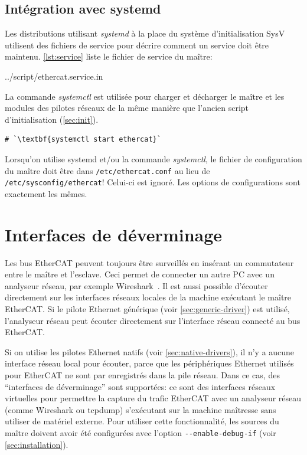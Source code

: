 \documentclass[a4paper,12pt,BCOR=6mm,bibtotoc,idxtotoc]{scrbook}
\begin{document}
\subsection{Int\'egration avec systemd}
\label{sec:systemd}

Les distributions utilisant \textit{systemd} \`a la place du syst\`eme
d'initialisation SysV utilisent des fichiers de service pour d\'ecrire
comment un service doit \^etre maintenu.  \autoref{lst:service} liste
le fichier de service du ma\^itre:


    {../script/ethercat.service.in}

La commande \textit{systemctl} est utilis\'ee pour charger et
d\'echarger le ma\^itre et les modules des pilotes r\'eseaux de la
m\^eme mani\`ere que l'ancien script d'initialisation
(\autoref{sec:init}).

\begin{lstlisting}[gobble=2]
  # `\textbf{systemctl start ethercat}`
\end{lstlisting}

Lorsqu'on utilise systemd et/ou la commande \textit{systemctl}, le
fichier de configuration du ma\^itre doit \^etre dans
\texttt{/etc/ethercat.conf} au lieu de
\texttt{/etc/sysconfig/ethercat}!  Celui-ci est ignor\'e. Les options
de configurations sont exactement les m\^emes.


\section{Interfaces de d\'everminage}
\label{sec:debug}

Les bus EtherCAT peuvent toujours \^etre surveill\'es en ins\'erant un
commutateur entre le ma\^itre et l'esclave. Ceci permet de connecter
un autre PC avec un analyseur r\'eseau, par exemple
Wireshark~\cite{wireshark}.  Il est aussi possible d'\'ecouter
directement sur les interfaces r\'eseaux locales de la machine
ex\'ecutant le ma\^itre EtherCAT.  Si le pilote Ethernet g\'en\'erique
(voir \autoref{sec:generic-driver}) est utilis\'e, l'analyseur
r\'eseau peut \'ecouter directement sur l'interface r\'eseau
connect\'e au bus EtherCAT.

Si on utilise les pilotes Ethernet natifs (voir
\autoref{sec:native-drivers}), il n'y a aucune interface r\'eseau
local pour \'ecouter, parce que les p\'eriph\'eriques Ethernet
utilis\'es pour EtherCAT ne sont par enregistr\'es dans la pile
r\'eseau.  Dans ce cas, des ``interfaces de d\'everminage'' sont
support\'ees: ce sont des interfaces r\'eseaux virtuelles pour
permettre la capture du trafic EtherCAT avec un analyseur r\'eseau
(comme Wireshark ou tcpdump) s'ex\'ecutant sur la machine ma\^itresse
sans utiliser de mat\'eriel externe.  Pour utiliser cette
fonctionnalit\'e, les sources du ma\^itre doivent avoir \'et\'e
configur\'ees avec l'option \lstinline+--enable-debug-if+ (voir
\autoref{sec:installation}).
\end{document}
